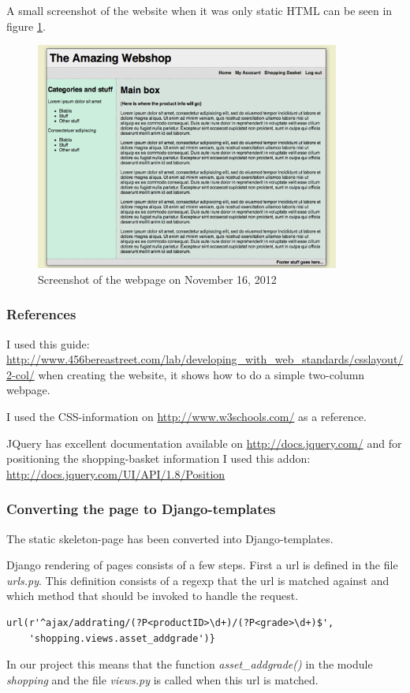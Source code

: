 \documentclass[12pt, a4paper,titlepage]{article}
\begin{document}
A small screenshot of the website when it was only static HTML can be seen in figure \ref{fig:sshot}.
\begin{figure}
\centering
\includegraphics[width=10cm]{Screenshot_2012-11-16.png}
\caption{Screenshot of the webpage on November 16, 2012}
\label{fig:sshot}
\end{figure}

\subsubsection{References}
I used this guide:
\url{http://www.456bereastreet.com/lab/developing_with_web_standards/csslayout/2-col/}
when creating the website, it shows how to do a simple two-column webpage.

I used the CSS-information on \url{http://www.w3schools.com/} as a reference.

JQuery has excellent documentation available on \url{http://docs.jquery.com/}
and for positioning the shopping-basket information I used this addon: 
\url{http://docs.jquery.com/UI/API/1.8/Position}

\subsubsection{Converting the page to Django-templates}
The static skeleton-page has been converted into Django-templates.

Django rendering of pages consists of a few steps. First a url is defined in the
file \emph{urls.py}. This definition consists of a regexp that the url is matched
against and which method that should be invoked to handle the request.
\lstset{numbers=none}
\begin{lstlisting}
url(r'^ajax/addrating/(?P<productID>\d+)/(?P<grade>\d+)$',
	'shopping.views.asset_addgrade')}
\end{lstlisting}
\lstset{numbers=left}
In our project this means that the function \emph{asset\_addgrade()} in the module \emph{shopping} and the file \emph{views.py} is called when this url
is matched.
\end{document}
